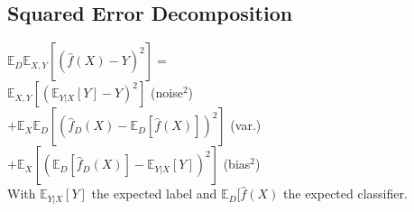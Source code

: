 \subsection*{Squared Error Decomposition}
$\mathbb{E}_D\mathbb{E}_{X,Y}[(\hat{f}(X)-Y)^2]=$\\
$\mathbb{E}_{X,Y}[(\mathbb{E}_{Y|X}[Y]-Y)^2]$ (noise$^2$)\\
$+\mathbb{E}_X\mathbb{E}_D[(\hat{f}_D(X)-\mathbb{E}_D[\hat{f}(X)])^2]$ (var.)\\
$+\mathbb{E}_X[(\mathbb{E}_D[\hat{f}_D(X)]-\mathbb{E}_{Y|X}[Y])^2]$ (bias$^2$)\\
With $\mathbb{E}_{Y|X}[Y]$ the expected label and $\mathbb{E}_{D}[\hat{f}(X)$ the expected classifier.